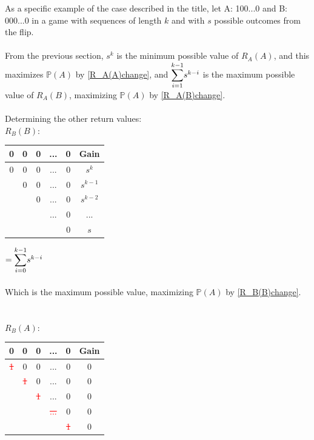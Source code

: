 \documentclass[english,12pt,a4paper,final]{article}
\begin{document}
As a specific example of the case described in the title, let A: 100...0 and B: 000...0 in a game with sequences of length $k$ and with $s$ possible outcomes from the flip.
\\\\
From the previous section, $s^k$ is the minimum possible value of $R_A(A)$, and this maximizes $\mathbb{P}(A)$ by \eqref{R_A(A)change}, and $\mathlarger\sum_{i=1}^{k-1}s^{k-i}$ is the maximum possible value of $R_A(B)$, maximizing $\mathbb{P}(A)$ by \eqref{R_A(B)change}.
\\\\
Determining the other return values:
\\
${R_B(B)}$:
\begin{tabular}{|ccccc|c|}
	\hline
	0 & 0 & 0 & ... & 0 & Gain \\
	\hline
	
	\textcolor{OliveGreen}{0} & \textcolor{OliveGreen}{0} & \textcolor{OliveGreen}{0} & \textcolor{OliveGreen}{...} & \textcolor{OliveGreen}{0} & $s^k$\\
	
	& \textcolor{OliveGreen}{0} & \textcolor{OliveGreen}{0} & \textcolor{OliveGreen}{...} & \textcolor{OliveGreen}{0} & $s^{k-1}$\\
	
	&  & \textcolor{OliveGreen}{0} & \textcolor{OliveGreen}{...} & \textcolor{OliveGreen}{0} & $s^{k-2}$ \\
	
	&  &  & \textcolor{OliveGreen}{...} & \textcolor{OliveGreen}{0} & ... \\
	
	&  &  &  & \textcolor{OliveGreen}{0} & $s$ \\
	\hline
\end{tabular}
$=\mathlarger\sum_{i=0}^{k-1}s^{k-i}$
\\\\
Which is the maximum possible value, maximizing $\mathbb{P}(A)$ by \eqref{R_B(B)change}.
\\\\\\
${R_B(A)}$:
\begin{tabular}{|ccccc|c|}
	\hline
	0 & 0 & 0 & ... & 0 & Gain \\
	\hline
	
	\textcolor{red}{\sout{1}} & 0 & 0 & ... & 0 & $0$\\
	
	& \textcolor{red}{\sout{1}} & 0 & ... & 0 & $0$\\
	
	&  & \textcolor{red}{\sout{1}} & ... & 0 & $0$\\
	
	&  &  & \textcolor{red}{\sout{...}} & 0 & $0$ \\
	
	&  &  &  & \textcolor{red}{\sout{1}} & $0$ \\
	\hline
\end{tabular}
\end{document}
